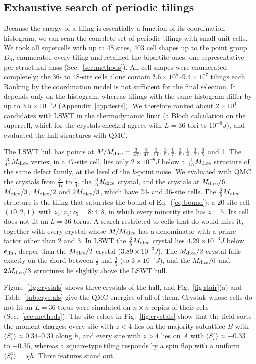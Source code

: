 \documentclass[prb,twocolumn,amsmath,amssymb,floatfix]{revtex4-2}
\newcommand{\Md}{M_{\rm dice}}
\begin{document}
\subsection{Exhaustive search of periodic tilings}

Because the energy of a tiling is essentially a function of its coordination histogram, we can scan the complete set of periodic tilings with small unit cells. We took all supercells with up to 48 sites, 403 cell shapes up to the point group $D_6$, enumerated every tiling and retained the bipartite ones, one representative per structural class (Sec.~\ref{sec:methods}). All cell shapes were enumerated completely; the 36- to 48-site cells alone contain $2.6\times10^5$--$9.4\times10^7$ tilings each. Ranking by the coordination model is not sufficient for the final selection. It depends only on the histogram, whereas tilings with the same histogram differ by up to $3.5\times10^{-4}J$ (Appendix~\ref{app:tests}). We therefore ranked about $2\times10^4$ candidates with LSWT in the thermodynamic limit (a Bloch calculation on the supercell, which for the crystals checked agrees with $L=36$ tori to $10^{-8}J$), and evaluated the hull structures with QMC.

The LSWT hull has points at $M/\Md=\frac3{47},\frac3{41},\frac1{11},\frac19,\frac17,\frac15,\frac14,\frac13,\frac35$ and 1. The $\frac3{47}\Md$ vertex, in a 47-site cell, lies only $2\times10^{-6}J$ below a $\frac1{15}\Md$ structure of the same defect family, at the level of the $k$-point noise. We evaluated with QMC the crystals from $\frac3{47}$ to $\frac14$, the $\frac35\Md$ crystal, and the crystals at $\Md/6$, $\Md/3$, $\Md/2$ and $2\Md/3$, which have 24- and 36-site cells. The $\frac35\Md$ structure is the tiling that saturates the bound of Eq.~(\ref{eq:bound}): a 20-site cell $(10,2,1)$ with $z_3{:}z_4{:}z_5=8{:}4{:}8$, in which every minority site has $z=5$. Its cell does not fit an $L=36$ torus. A search restricted to cells that do would miss it, together with every crystal whose $M/\Md$ has a denominator with a prime factor other than 2 and 3. In LSWT the $\frac35\Md$ crystal lies $4.29\times10^{-3}J$ below $e_{\rm lin}$, deeper than the $\Md/2$ crystal ($3.89\times10^{-3}J$). The $\Md/2$ crystal falls exactly on the chord between $\frac13$ and $\frac35$ (to $3\times10^{-6}J$), and the $\Md/6$ and $2\Md/3$ structures lie slightly above the LSWT hull.

Figure~\ref{fig:crystals} shows three crystals of the hull, and Fig.~\ref{fig:stair}(a) and Table~\ref{tab:crystals} give the QMC energies of all of them. Crystals whose cells do not fit an $L=36$ torus were simulated on $n\times n$ copies of their cells (Sec.~\ref{sec:methods}). The site colors in Fig.~\ref{fig:crystals} show that the field sorts the moment charges: every site with $z<4$ lies on the majority sublattice $B$ with $\langle S^z_i\rangle\approx0.34$--$0.39$ along $h$, and every site with $z>4$ lies on $A$ with $\langle S^z_i\rangle\approx-0.33$ to $-0.35$, whereas a square-type tiling responds by a spin flop with a uniform $\langle S^z_i\rangle=\chi h$. Three features stand out.
\end{document}
